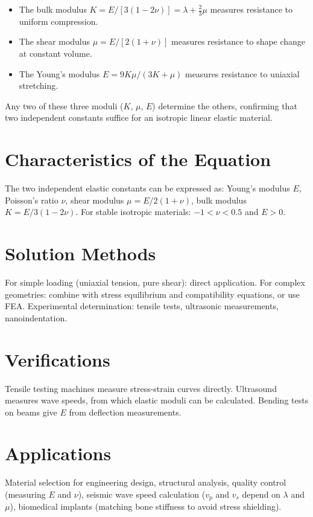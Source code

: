 \begin{itemize}
\item The bulk modulus $K = E/[3(1-2\nu)] = \lambda + \frac{2}{3}\mu$ measures resistance to uniform compression.
\item The shear modulus $\mu = E/[2(1+\nu)]$ measures resistance to shape change at constant volume.
\item The Young's modulus $E = 9K\mu/(3K + \mu)$ measures resistance to uniaxial stretching.
\end{itemize}

Any two of these three moduli ($K$, $\mu$, $E$) determine the others, confirming that two independent constants suffice for an isotropic linear elastic material.

\section*{Characteristics of the Equation}

The two independent elastic constants can be expressed as: Young's modulus $E$, Poisson's ratio $\nu$, shear modulus $\mu = E/2(1+\nu)$, bulk modulus $K = E/3(1-2\nu)$. For stable isotropic materials: $-1 < \nu < 0.5$ and $E > 0$.
\section*{Solution Methods}

For simple loading (uniaxial tension, pure shear): direct application. For complex geometries: combine with stress equilibrium and compatibility equations, or use FEA. Experimental determination: tensile tests, ultrasonic measurements, nanoindentation.
\section*{Verifications}

Tensile testing machines measure stress-strain curves directly. Ultrasound measures wave speeds, from which elastic moduli can be calculated. Bending tests on beams give $E$ from deflection measurements.
\section*{Applications}

Material selection for engineering design, structural analysis, quality control (measuring $E$ and $\nu$), seismic wave speed calculation ($v_p$ and $v_s$ depend on $\lambda$ and $\mu$), biomedical implants (matching bone stiffness to avoid stress shielding).

